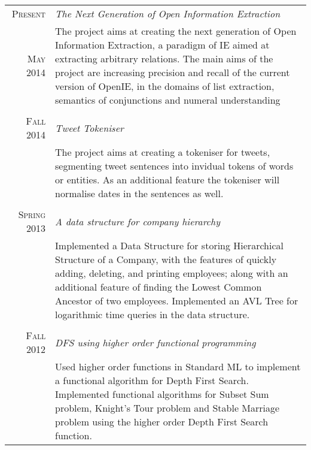 \documentclass[a4paper,10pt]{article} %
\begin{document}
\begin{tabular}{r|p{11cm}}

\textsc{Present} & \emph{The Next Generation of Open Information Extraction}\\ 
\textsc{May 2014} & \footnotesize{The project aims at creating the next generation of Open Information Extraction, a paradigm of IE aimed at extracting arbitrary relations. The main aims of the project are increasing precision and recall of the current version of OpenIE, in  the domains of list extraction, semantics of conjunctions and numeral understanding }\\
\multicolumn{2}{c}{} \\


\textsc{Fall 2014}& \emph{Tweet Tokeniser}\\ 
 & \footnotesize{The project aims at creating a tokeniser for tweets, segmenting tweet sentences into invidual tokens of words or entities. As an additional feature the tokeniser will normalise dates in the sentences as well.}\\
\multicolumn{2}{c}{} \\


\textsc{Spring 2013} & \emph{A data structure for company hierarchy}\\ 
& \footnotesize{Implemented a Data Structure for storing Hierarchical Structure of a Company, with the features of quickly adding, deleting, and printing employees; along with an additional feature of finding the Lowest Common Ancestor of two employees. Implemented an AVL Tree for logarithmic time queries in the data structure.}\\
\multicolumn{2}{c}{} \\


\textsc{Fall 2012} & \emph{DFS using higher order functional programming}\\ 
& \footnotesize{Used higher order functions in Standard ML to implement a functional algorithm for Depth First Search. Implemented functional algorithms for Subset Sum problem, Knight's Tour problem and Stable Marriage problem using the higher order Depth First Search function.}\\

\end{tabular}
\end{document}

